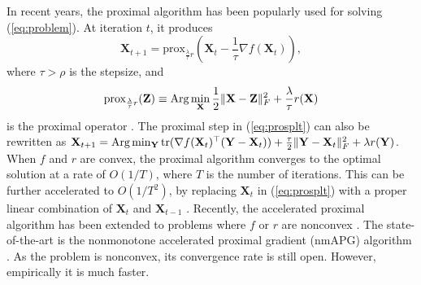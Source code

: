\documentclass[10pt,journal,compsoc]{IEEEtran}
\def\l{\lambda}
\newcommand{\X}{\mathbf{X}}
\newcommand{\NM}[2]{\| #1 \|_{#2} }
\newcommand{\Prox}[2]{\text{prox}_{#1}(#2)}
\newcommand{\Tr}[1]{\text{tr}( #1 ) }
\newcommand{\f}[1]{f(#1)}
\begin{document}
In recent years, the proximal algorithm
\cite{parikh2014proximal} has been popularly used for solving
(\ref{eq:problem}).
At iteration $t$, it produces 
\begin{equation} \label{eq:prosplt}
\X_{t+1} = \Prox{\frac{\lambda}{\tau} r}{\X_t - \frac{1}{\tau} \nabla f(\X_t)},
\end{equation} 
where
$\tau > \rho$ is the stepsize, and
\begin{align}
\Prox{\frac{\l}{\tau} r}{\mathbf{Z}}
\equiv \text{\normalfont Arg}\min_{\X} \frac{1}{2} \NM{\X - \mathbf{Z}}{F}^2  + \frac{\lambda}{\tau} r(\X)
\label{eq:proxoper}
\end{align}
is the proximal operator \cite{parikh2014proximal}.
The proximal step in (\ref{eq:prosplt}) can also be rewritten as
$\X_{t+1} = 
\text{\normalfont Arg}\min_{\mathbf{Y}} 
\Tr{\nabla \f{\X_t}^\top (\mathbf{Y} - \X_t)}
+  
\frac{\tau}{2} \NM{\mathbf{Y} - \X_t}{F}^2 
+ 
\l r(\mathbf{Y})$.
When $f$ and $r$ are convex,
the proximal algorithm converges to the optimal solution at a rate of $O(1/T)$,
where $T$ is the number of iterations.
This can be further accelerated
to 
$O(1/T^2)$, by replacing $\X_t$ in (\ref{eq:prosplt}) with a proper linear combination of $\X_t$ and $\X_{t-1}$
\cite{beck2009fast}.
Recently, the accelerated proximal algorithm has been extended to
problems
where $f$ or $r$ are nonconvex \cite{li2015accelerated,ghadimi2016accelerated}.
The state-of-the-art
is the nonmonotone accelerated proximal gradient
(\textsf{nmAPG}) algorithm \cite{li2015accelerated}. 
As the problem is nonconvex, its convergence rate is still open.  
However, empirically it is much faster.
\end{document}
